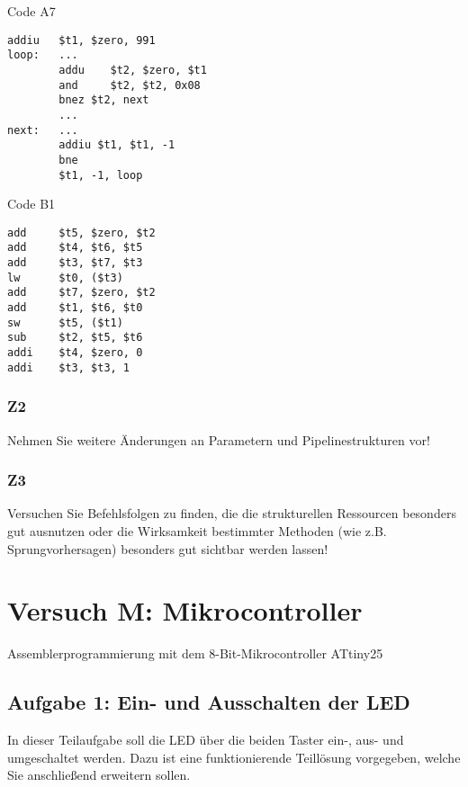 \documentclass[a4paper,12pt,titlepage]{scrartcl}
\begin{document}
Code A7
\begin{lstlisting}[basicstyle=\tiny]
        addiu   $t1, $zero, 991
loop:   ...
        addu    $t2, $zero, $t1
        and     $t2, $t2, 0x08
        bnez $t2, next
        ...
next:   ...
        addiu $t1, $t1, -1
        bne
        $t1, -1, loop
\end{lstlisting}

Code B1
\begin{lstlisting}[basicstyle=\tiny]
add     $t5, $zero, $t2
add     $t4, $t6, $t5
add     $t3, $t7, $t3
lw      $t0, ($t3)
add     $t7, $zero, $t2
add     $t1, $t6, $t0
sw      $t5, ($t1)
sub     $t2, $t5, $t6
addi    $t4, $zero, 0
addi    $t3, $t3, 1
\end{lstlisting}

\subsubsection*{Z2}
Nehmen Sie weitere Änderungen an Parametern und Pipelinestrukturen vor!

\subsubsection*{Z3}
Versuchen Sie Befehlsfolgen zu finden, die die strukturellen Ressourcen besonders gut ausnutzen oder die Wirksamkeit bestimmter Methoden (wie z.B. Sprungvorhersagen) besonders gut sichtbar werden lassen!


\section*{Versuch M: Mikrocontroller}
Assemblerprogrammierung mit dem 8-Bit-Mikrocontroller ATtiny25

\subsection*{Aufgabe 1: Ein- und Ausschalten der LED}
In dieser Teilaufgabe soll die LED über die beiden Taster ein-, aus- und umgeschaltet werden. Dazu
ist eine funktionierende Teillösung vorgegeben, welche Sie anschließend erweitern sollen.
\end{document}
